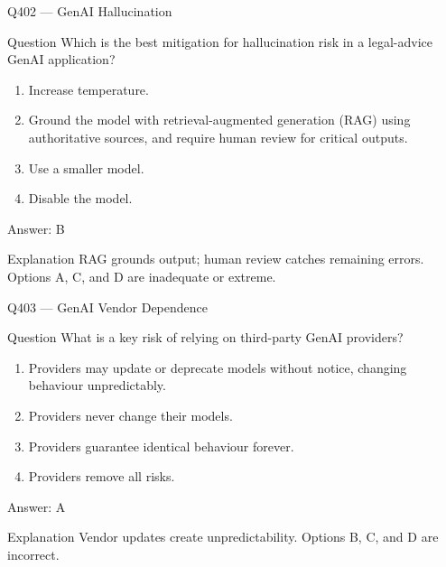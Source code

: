 \documentclass[aspectratio=169,8pt]{beamer}
\begin{document}
	\begin{frame}{Q402 --- GenAI Hallucination}
		\begin{block}{Question}
			Which is the best mitigation for hallucination risk in a legal-advice GenAI application?
			\begin{enumerate}
				\item Increase temperature.
				\item Ground the model with retrieval-augmented generation (RAG) using authoritative sources, and require human review for critical outputs.
				\item Use a smaller model.
				\item Disable the model.
			\end{enumerate}
		\end{block}
		\begin{exampleblock}{Answer: B}\end{exampleblock}
		\begin{block}{Explanation}
			RAG grounds output; human review catches remaining errors. Options A, C, and D are inadequate or extreme.
		\end{block}
	\end{frame}
	
	\begin{frame}{Q403 --- GenAI Vendor Dependence}
		\begin{block}{Question}
			What is a key risk of relying on third-party GenAI providers?
			\begin{enumerate}
				\item Providers may update or deprecate models without notice, changing behaviour unpredictably.
				\item Providers never change their models.
				\item Providers guarantee identical behaviour forever.
				\item Providers remove all risks.
			\end{enumerate}
		\end{block}
		\begin{exampleblock}{Answer: A}\end{exampleblock}
		\begin{block}{Explanation}
			Vendor updates create unpredictability. Options B, C, and D are incorrect.
		\end{block}
	\end{frame}
	
\end{document}
